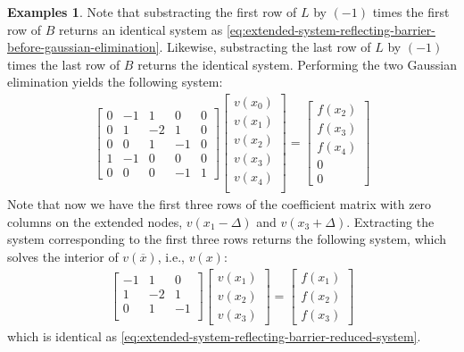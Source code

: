 \documentclass[11pt]{article}
\theoremstyle{definition}
\newtheorem{example}{Examples}[section]
\begin{document}
\begin{example}
	Note that substracting the first row of ${L}$ by $(-1)$ times the first row of $B$ returns an identical system as \eqref{eq:extended-system-reflecting-barrier-before-gaussian-elimination}. Likewise, substracting the last row of ${L}$ by $(-1)$ times the last row of $B$ returns the identical system. Performing the two Gaussian elimination yields the following system:
	\begin{align}\label{eq:extended-system-reflecting-barrier-after-gaussian-elimination}
	\begin{bmatrix}
	0 & -1 & 1 & 0 & 0 \\
	0 & 1 & -2 & 1 & 0 \\
	0 & 0 & 1 & -1 & 0 \\
	1 & -1  & 0 & 0 & 0 \\
	0 & 0 & 0 & -1 & 1
	\end{bmatrix} 	  \begin{bmatrix}
	v(x_0) \\
	v(x_1) \\
	v(x_2) \\
	v(x_3) \\
	v(x_4)  \\
	\end{bmatrix}
	=
	\begin{bmatrix}
	f(x_2) \\
	f(x_3) \\
	f(x_4) \\
	0 \\
	0
	\end{bmatrix}
	\end{align}
	Note that now we have the first three rows of the coefficient matrix with zero columns on the extended nodes, $v(x_1 - \Delta)$ and $v(x_3 + \Delta)$. Extracting the system corresponding to the first three rows returns the following system, which solves the interior of $v(\overline{x})$, i.e., $v(x)$:
	\begin{align}
	\begin{bmatrix}
	-1 & 1 & 0  \\
	1 & -2 & 1 \\
	0 & 1 & -1 \\
	\end{bmatrix} 	  \begin{bmatrix}
	v(x_1) \\
	v(x_2) \\
	v(x_3)
	\end{bmatrix}
	=
	\begin{bmatrix}
	f(x_1) \\
	f(x_2) \\
	f(x_3)
	\end{bmatrix}
	\end{align}
	which is identical as  \eqref{eq:extended-system-reflecting-barrier-reduced-system}.
\end{example}
\end{document}
